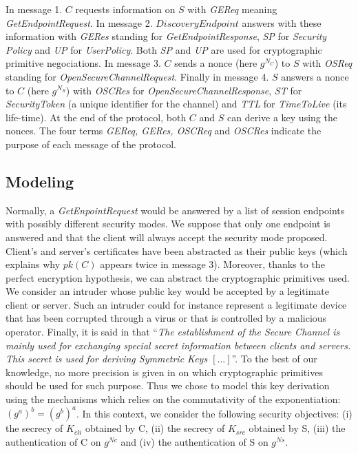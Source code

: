 In message 1. $C$ requests information on $S$ with {\em GEReq} meaning
{\em GetEndpointRequest}.
In message 2. $DiscoveryEndpoint$ answers with these information with
{\em GERes} standing for {\em GetEndpointResponse}, {\em SP} for
{\em Security Policy} and {\em UP} for {\em UserPolicy}.
Both {\em SP} and {\em UP} are used for cryptographic primitive negociations.
In message 3. $C$ sends a nonce (here $g^{N_{C}}$) to $S$ with {\em OSReq}
standing for {\em OpenSecureChannelRequest}.
Finally in message 4. $S$ answers a nonce to $C$ (here $g^{N_{S}}$) with
{\em OSCRes} for {\em OpenSecureChannelResponse}, {\em ST} for
{\em SecurityToken} (a unique identifier for the channel) and {\em TTL} for
{\em TimeToLive} (its life-time).
At the end of the protocol, both $C$ and $S$ can derive a key using the nonces.
The four terms {\em GEReq, GERes, OSCReq} and {\em OSCRes} indicate the purpose
of each message of the protocol.

\subsection{Modeling}

Normally, a {\em GetEnpointRequest} would be answered by a list of
session endpoints with possibly different security modes. We suppose
that only one endpoint is answered and that the client will always
accept the security mode proposed.
Client's and server's certificates have been abstracted as their public
keys (which explains why $pk(C)$ appears twice in message 3).
Moreover, thanks to the perfect
encryption hypothesis, we can abstract the cryptographic primitives
used.  We consider an intruder whose public key would be accepted by a
legitimate client or server.  Such an intruder could for instance
represent a legitimate device that has been corrupted through a virus
or that is controlled by a malicious operator.  Finally, it is said in
\cite{MLD09} that ``\emph{The establishment of the Secure Channel is
  mainly used for exchanging special secret information between
  clients and servers. This secret is used for deriving Symmetric Keys
  $[...]$}''.  To the best of our knowledge, no more precision is
given in \cite{MLD09,opcua_part2,opcua_part4,opcua_part6} on which
cryptographic primitives should be used for such purpose.  Thus we
chose to model this key derivation using the \DiH mechanisms which
relies on the commutativity of the exponentiation: $(g^a)^b =
(g^b)^a$.  In this context, we consider the following security objectives: (i)
the secrecy of $K_{cli}$ obtained by C, (ii) the secrecy of $K_{src}$ obtained
by S, (iii) the authentication of C on $g^{Nc}$ and (iv) the authentication of S
on $g^{Ns}$.

